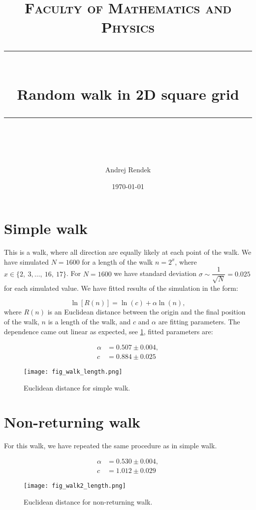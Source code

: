 \documentclass[11pt]{scrartcl} %
\title{	
	\normalfont\normalsize
	\textsc{Faculty of Mathematics and Physics}\\ %
	\vspace{25pt} %
	\rule{\linewidth}{0.5pt}\\ %
	\vspace{20pt} %
	{\huge Random walk in 2D square grid}\\ %
	\vspace{12pt} %
	\rule{\linewidth}{2pt}\\ %
	\vspace{12pt} %
}
\author{\LARGE Andrej Rendek} %
\date{\normalsize\today} %
\begin{document}
\maketitle %

\section{Simple walk}

This is a walk, where all direction are equally likely at each point of the walk. We have simulated $N = 1600$ for a length of the walk $n = 2^x$, where $x \in \{2, \ 3, \dots, \ 16, \ 17\}$. For $N = 1600$ we have standard deviation $\sigma \sim \dfrac{1}{\sqrt{N}} = 0.025$ for each simulated value. We have fitted results of the simulation in the form:

\begin{equation*}
	\ln \left[R(n) \right] = \ln(c) + \alpha \ln(n),
\end{equation*}
where $R(n)$ is an Euclidean distance between the origin and the final position of the walk, $n$ is a length of the walk, and $c$ and $\alpha$ are fitting parameters. The dependence came out linear as expected, see \ref{fig:simple-fit}, fitted parameters are:

\begin{align}
	\alpha &= 0.507 \pm 0.004, \\
	c &= 0.884 \pm 0.025
\end{align}

\begin{figure}[h] 
	\centering
	\texttt{[image: fig\_walk\_length.png]} 
	\caption{Euclidean distance for simple walk.}
	\label{fig:simple-fit}
\end{figure}

\section{Non-returning walk}

For this walk, we have repeated the same procedure as in simple walk. 

\begin{align}
	\alpha &= 0.530 \pm 0.004, \\
	c &= 1.012 \pm 0.029
\end{align}

\begin{figure}[h] 
	\centering
	\texttt{[image: fig\_walk2\_length.png]} 
	\caption{Euclidean distance for non-returning walk.}
\end{figure}
\end{document}

